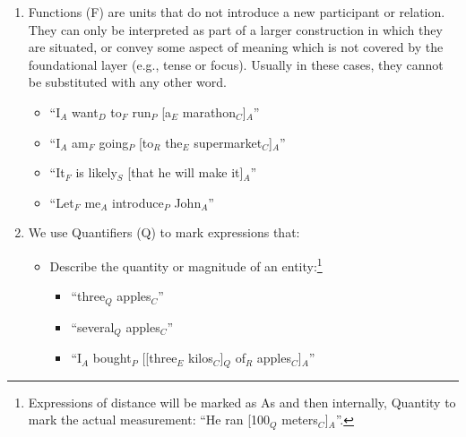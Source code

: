 \documentclass[11pt]{article}
\newcommand{\dd}[1]{{\color{blue}{#1}}}
\newcommand{\oa}[1]{{\color{blue}{OA: #1}}}
\newcommand{\nss}[1]{{\color{magenta}{NSS: #1}}}
\begin{document}
\begin{enumerate}
\item
  Functions (F) are units that do not introduce a new participant or relation.
  They can only be interpreted as part of a larger construction in which they are situated,
  or convey some aspect of meaning which is not covered by the foundational layer (e.g., tense or focus).
  Usually in these cases, they cannot be substituted with any other word.

  \begin{itemize}
  \item
    ``I$_A$ want$_D$ to$_F$ run$_P$ [a$_E$ marathon$_C$]$_A$''
  \item
    ``I$_A$ am$_F$ going$_P$ [to$_R$ the$_E$ supermarket$_C$]$_A$''
  \item
    ``It$_F$ is likely$_S$ [that he will make it]$_A$''
  \item
    ``Let$_F$ me$_A$ introduce$_P$ John$_A$''
  \end{itemize}
  
  
  
 \item We use {\sc Quantifiers (Q)} to mark expressions that:
 
\begin{itemize}
\item Describe the quantity or magnitude of an entity:\footnote{Expressions of distance will be marked as As and then internally, Quantity to mark the actual measurement: ``He ran [100$_Q$ meters$_C$]$_A$''.}

\begin{itemize}
\item
``three$_Q$ apples$_C$''
\item
``several$_Q$ apples$_C$''
\item
``I$_A$ bought$_P$ [[three$_E$ kilos$_C$]$_Q$ of$_R$ apples$_C$]$_A$''
\end{itemize}
 

\end{itemize}
\end{enumerate}
\end{document}
